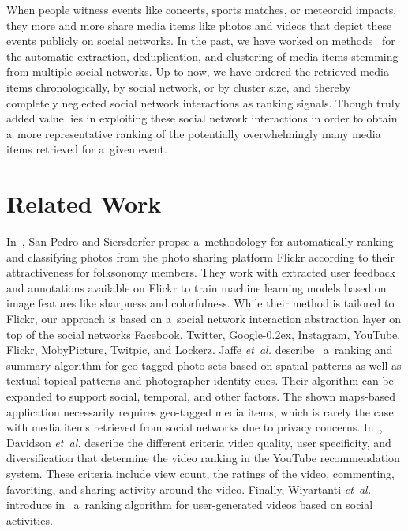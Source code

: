 \documentclass{sig-alternate}
\DeclareRobustCommand{\googleplus}{\mbox{Google\hspace{0em}\raisebox{.28ex}{\tiny\bf +}\kern-0.2ex}\xspace}
\begin{document}
When people witness events like concerts, sports matches, or meteoroid impacts,
they more and more share media items like photos and videos
that depict these events publicly on social networks.
In the past, we have worked on methods~%
\cite{khrouf2012aggregatingsocialmedia,rizzo2012whatfresh,steiner2011addingmeaning}
for the automatic extraction, deduplication, and clustering of media items
stemming from multiple social networks.
Up to now, we have ordered the retrieved media items chronologically,
by social network, or by cluster size, and thereby completely neglected
social network interactions as ranking signals.
Though truly added value lies in exploiting these social network interactions
in order to obtain a~more representative ranking of the
potentially overwhelmingly many media items retrieved for a~given event.

\section{Related Work}

In~\cite{sanpedro2009ranking}, San Pedro and Siersdorfer propse a~methodology
for automatically ranking and classifying photos from the photo sharing platform Flickr
according to their attractiveness for folksonomy members.
They work with extracted user feedback and annotations available on Flickr
to train machine learning models based on
image features like sharpness and colorfulness.
While their method is tailored to Flickr,
our approach is based on a~social network interaction abstraction layer
on top of the social networks Facebook, Twitter, \googleplus, Instagram,
YouTube, Flickr, MobyPicture, Twitpic, and Lockerz.
Jaffe \emph{et~al.} describe~\cite{jaffe2006generatingsummaries} 
a~ranking and summary algorithm for geo-tagged photo sets based on spatial patterns
as well as textual-topical patterns and photographer identity cues.
Their algorithm can be expanded to support social, temporal, and other factors.
The shown maps-based application necessarily requires geo-tagged media items,
which is rarely the case with media items retrieved from social networks
due to privacy concerns. 
In~\cite{davidson2010youtube}, Davidson \emph{et~al.} describe the different criteria
video quality, user specificity, and diversification
that determine the video ranking in the YouTube recommendation system.
These criteria include view count, the ratings of the video, commenting, favoriting,
and sharing activity around the video.
Finally, Wiyartanti \emph{et~al.} introduce in~\cite{wiyartanti2008ranking}
a~ranking algorithm for user-generated videos based on social activities.
\end{document}

